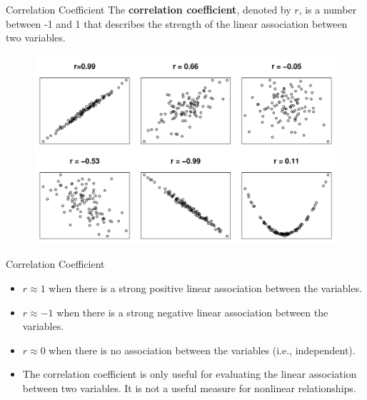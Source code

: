 \documentclass[11pt, fleqn]{beamer}\usepackage[]{graphicx}\usepackage[]{color}
\begin{document}
\begin{frame}{Correlation Coefficient}
The \textbf{correlation coefficient}, denoted by $r$, is a number between -1 and 1 that describes the strength of the linear association between two variables.
\begin{figure}
\includegraphics[scale=0.4]{figure/correlations.pdf}
\end{figure}
\end{frame}

\begin{frame}{Correlation Coefficient}
\begin{itemize}
\item $r \approx 1$ when there is a strong positive linear association between the variables.
\vspace{5pt}
\item $r \approx -1$ when there is a strong negative linear association between the variables.
\vspace{5pt}
\item $r \approx 0$ when there is no association between the variables (i.e., independent).
\vspace{5pt}
\item The correlation coefficient is only useful for evaluating the linear association between two variables.  It is not a useful measure for nonlinear relationships.
\end{itemize}
\end{frame}
\end{document}
